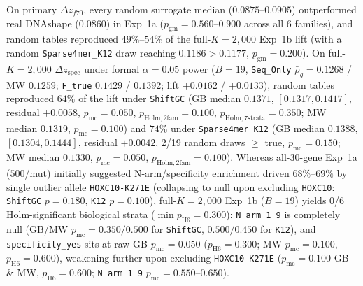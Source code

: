 \documentclass[11pt,a4paper]{article}
\begin{document}
On primary $\Delta z_{f70}$, every random surrogate median ($0.0875\text{--}0.0905$) outperformed real DNAshape ($0.0860$) in Exp~1a ($p_{\mathrm{gm}} = 0.560\text{--}0.900$ across all 6 families), and random tables reproduced $49\%\text{--}54\%$ of the full-$K=2{,}000$ Exp~1b lift (with a random \texttt{Sparse4mer\_K12} draw reaching $0.1186 > 0.1177$, $p_{\mathrm{gm}} = 0.200$). On full-$K=2{,}000$ $\Delta z_{\mathrm{spec}}$ under formal $\alpha = 0.05$ power ($B = 19$, \texttt{Seq\_Only} $\bar{\rho}_g = 0.1268$ / MW $0.1259$; \texttt{F\_true} $0.1429$ / $0.1392$; lift $+0.0162$ / $+0.0133$), random tables reproduced $64\%$ of the lift under \texttt{ShiftGC} (GB median $0.1371$, $[0.1317, 0.1417]$, residual $+0.0058$, $p_{\mathrm{mc}} = 0.050$, $p_{\mathrm{Holm,2fam}} = 0.100$, $p_{\mathrm{Holm,7strata}} = 0.350$; MW median $0.1319$, $p_{\mathrm{mc}} = 0.100$) and $74\%$ under \texttt{Sparse4mer\_K12} (GB median $0.1388$, $[0.1304, 0.1444]$, residual $+0.0042$, 2/19 random draws $\ge$ true, $p_{\mathrm{mc}} = 0.150$; MW median $0.1330$, $p_{\mathrm{mc}} = 0.050$, $p_{\mathrm{Holm,2fam}} = 0.100$). Whereas all-30-gene Exp~1a ($500$/mut) initially suggested N-arm/specificity enrichment driven $68\%\text{--}69\%$ by single outlier allele \texttt{HOXC10-K271E} (collapsing to null upon excluding \texttt{HOXC10}: \texttt{ShiftGC} $p = 0.180$, \texttt{K12} $p = 0.100$), full-$K=2{,}000$ Exp~1b ($B = 19$) yields 0/6 Holm-significant biological strata ($\min p_{\mathrm{H6}} = 0.300$): \texttt{N\_arm\_1\_9} is completely null (GB/MW $p_{\mathrm{mc}} = 0.350/0.500$ for \texttt{ShiftGC}, $0.500/0.450$ for \texttt{K12}), and \texttt{specificity\_yes} sits at raw GB $p_{\mathrm{mc}} = 0.050$ ($p_{\mathrm{H6}} = 0.300$; MW $p_{\mathrm{mc}} = 0.100$, $p_{\mathrm{H6}} = 0.600$), weakening further upon excluding \texttt{HOXC10-K271E} ($p_{\mathrm{mc}} = 0.100$ GB \& MW, $p_{\mathrm{H6}} = 0.600$; \texttt{N\_arm\_1\_9} $p_{\mathrm{mc}} = 0.550\text{--}0.650$).
\end{document}
